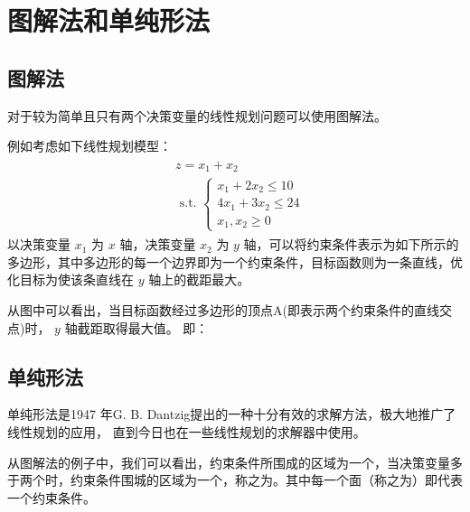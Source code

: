 \documentclass[letterpaper,10pt,english]{sphinxmanual}
\let\sphinxpxdimen\pdfpxdimen\else\newdimen\sphinxpxdimen
\begin{document}
\section{图解法和单纯形法}
\label{\detokenize{docs/LP:id6}}

\subsection{图解法}
\label{\detokenize{docs/LP:id7}}
对于较为简单且只有两个决策变量的线性规划问题可以使用图解法。

例如考虑如下线性规划模型：
\begin{equation*}
\begin{split}
\begin{aligned}
&z= x_{1}+ x_{2}\\
&\text { s.t. }\left\{\begin{array}{l}
{x_{1}+2 x_{2} \leq 10} \\
{4 x_{1}+3 x_{2} \leq 24} \\
{x_{1}, x_{2} \geq 0}
\end{array}\right.
\end{aligned}
\end{split}
\end{equation*}
以决策变量 \(x_1\) 为 \(x\) 轴，决策变量 \(x_2\) 为 \(y\) 轴，可以将约束条件表示为如下所示的多边形，其中多边形的每一个边界即为一个约束条件，目标函数则为一条直线，优化目标为使该条直线在 \(y\) 轴上的截距最大。

\begin{figure}[htbp]
\centering

\noindent\sphinxincludegraphics[height=450\sphinxpxdimen]{{p1}.svg}
\end{figure}

从图中可以看出，当目标函数经过多边形的顶点A(即表示两个约束条件的直线交点)时， \(y\) 轴截距取得最大值。
即：


\subsection{单纯形法}
\label{\detokenize{docs/LP:id8}}
单纯形法是1947 年G. B. Dantzig提出的一种十分有效的求解方法，极大地推广了线性规划的应用，
直到今日也在一些线性规划的求解器中使用。

从图解法的例子中，我们可以看出，约束条件所围成的区域为一个，当决策变量多于两个时，约束条件围城的区域为一个，称之为。其中每一个面（称之为）即代表一个约束条件。
\end{document}
